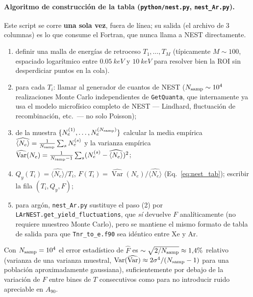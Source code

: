 \documentclass[11pt,a4paper]{article}
\newcommand{\Tnr}{T}
\newcommand{\Ne}{N_{e}}
\newcommand{\code}[1]{\texttt{#1}}
\begin{document}
\paragraph{Algoritmo de construcci\'on de la tabla (\code{python/nest.py},
\code{nest\_Ar.py}).} Este script se corre \textbf{una sola vez}, fuera de
l\'inea; su salida (el archivo de 3 columnas) es lo que consume el Fortran, que
nunca llama a NEST directamente.
\begin{enumerate}\itemsep2pt
  \item definir una malla de energ\'ias de retroceso $\Tnr_{1},\ldots,\Tnr_{M}$
    (t\'ipicamente $M\sim100$, espaciado logar\'itmico entre
    $\SI{0.05}{keV}$ y $\SI{10}{keV}$ para resolver bien la ROI sin desperdiciar
    puntos en la cola).
  \item para cada $\Tnr_{i}$: llamar al generador de cuantos de NEST
    ($N_{\rm samp}\sim10^{4}$ realizaciones Monte Carlo independientes de
    \code{GetQuanta}, que internamente ya usa el modelo microf\'isico completo de
    NEST --- Lindhard, fluctuaci\'on de recombinaci\'on, etc.\ --- no solo
    Poisson);
  \item de la muestra $\{\Ne^{(1)},\ldots,\Ne^{(N_{\rm samp})}\}$ calcular la
    media emp\'irica $\widehat{\langle\Ne\rangle}=\tfrac1{N_{\rm
    samp}}\sum_{s}\Ne^{(s)}$ y la varianza emp\'irica
    $\widehat{\operatorname{Var}}(\Ne)=\tfrac1{N_{\rm
    samp}-1}\sum_{s}(\Ne^{(s)}-\widehat{\langle\Ne\rangle})^{2}$;
  \item $Q_{y}(\Tnr_{i})=\widehat{\langle\Ne\rangle}/\Tnr_{i}$,
    $F(\Tnr_{i})=\widehat{\operatorname{Var}}(\Ne)/\widehat{\langle\Ne\rangle}$
    (Eq.~\eqref{eq:nest_tab}); escribir la fila $(\Tnr_{i},Q_{y},F)$;
  \item para arg\'on, \code{nest\_Ar.py} sustituye el paso (2) por
    \code{LArNEST.get\_yield\_fluctuations}, que \emph{s\'i} devuelve
    $F$ anal\'iticamente (no requiere muestreo Monte Carlo), pero se mantiene el
    mismo formato de tabla de salida para que \code{Tnr\_to\_e.f90} sea id\'entico
    entre Xe y Ar.
\end{enumerate}
Con $N_{\rm samp}=10^{4}$ el error estad\'istico de $\widehat F$ es
$\sim\sqrt{2/N_{\rm samp}}\approx1{,}4\%$ relativo (varianza de una varianza
muestral, $\operatorname{Var}(\widehat{\operatorname{Var}})\approx
2\sigma^{4}/(N_{\rm samp}-1)$ para una poblaci\'on aproximadamente gaussiana),
suficientemente por debajo de la variaci\'on de $F$ entre bines de $\Tnr$
consecutivos como para no introducir ruido apreciable en $A_{90}$.
\end{document}
